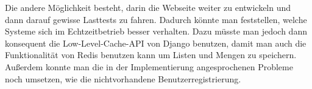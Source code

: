 Die andere Möglichkeit besteht, darin die Webseite weiter zu entwickeln und
dann darauf gewisse Lasttests zu fahren. Dadurch könnte man feststellen, welche
Systeme sich im Echtzeitbetrieb besser verhalten. Dazu müsste man jedoch dann
konsequent die Low-Level-Cache-API von Django benutzen, damit man auch die
Funktionalität von Redis benutzen kann um Listen und Mengen zu speichern.
Außerdem konnte man die in der Implementierung angesprochenen Probleme noch
umsetzen, wie die nichtvorhandene Benutzerregistrierung.
